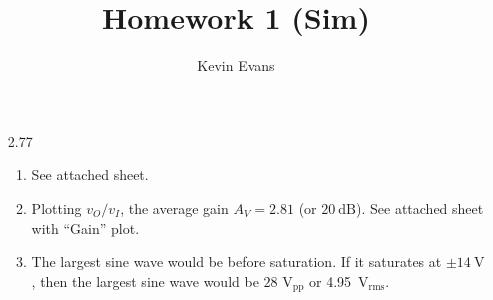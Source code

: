 \documentclass{homework}
\title{Homework 1 (Sim)}
\author{Kevin Evans}
\begin{document}
	\maketitle
	
	\begin{enumerate}
		\item[2.77] \begin{enumerate}
				\item See attached sheet.
				\item Plotting $v_O/v_I$, the average gain $A_V=2.81$ (or $\SI{20}{\dB}$). See attached sheet with ``Gain'' plot.
				\item The largest sine wave would be before saturation. If it saturates at $\pm \SI{14}{\V}$, then the largest sine wave would be $28 \text{ V}_\mathrm{pp}$ or \SI{4.95}{\V}$_\mathrm{rms}$.
			\end{enumerate}
	\end{enumerate}
\end{document}
